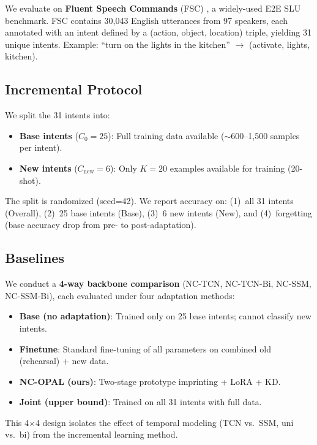 \documentclass[11pt]{article}
\begin{document}
We evaluate on \textbf{Fluent Speech Commands} (FSC) \cite{lugosch2019speech}, a widely-used E2E SLU benchmark.
FSC contains 30,043 English utterances from 97 speakers, each annotated with an intent defined by a (action, object, location) triple, yielding 31 unique intents.
Example: ``turn on the lights in the kitchen'' $\rightarrow$ (activate, lights, kitchen).

\subsection{Incremental Protocol}

We split the 31 intents into:
\begin{itemize}
\setlength\itemsep{0pt}
\item \textbf{Base intents} ($C_0 = 25$): Full training data available ($\sim$600--1,500 samples per intent).
\item \textbf{New intents} ($C_{\text{new}} = 6$): Only $K=20$ examples available for training (20-shot).
\end{itemize}

The split is randomized (seed=42).
We report accuracy on:
(1)~all 31 intents (Overall),
(2)~25 base intents (Base),
(3)~6 new intents (New),
and (4)~forgetting (base accuracy drop from pre- to post-adaptation).

\subsection{Baselines}

We conduct a \textbf{4-way backbone comparison} (NC-TCN, NC-TCN-Bi, NC-SSM, NC-SSM-Bi), each evaluated under four adaptation methods:

\begin{itemize}
\setlength\itemsep{0pt}
\item \textbf{Base (no adaptation)}: Trained only on 25 base intents; cannot classify new intents.
\item \textbf{Finetune}: Standard fine-tuning of all parameters on combined old (rehearsal) + new data.
\item \textbf{NC-OPAL (ours)}: Two-stage prototype imprinting + LoRA + KD.
\item \textbf{Joint (upper bound)}: Trained on all 31 intents with full data.
\end{itemize}

This 4$\times$4 design isolates the effect of temporal modeling (TCN vs.\ SSM, uni vs.\ bi) from the incremental learning method.
\end{document}
